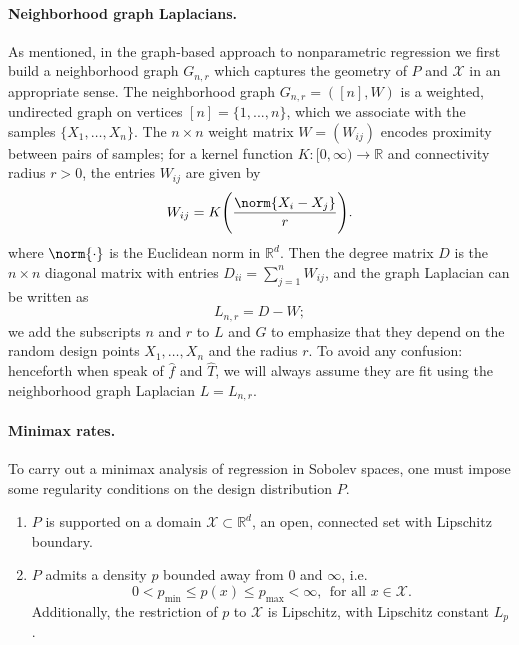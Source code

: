 \documentclass[twoside]{article}
\newcommand{\Reals}{\mathbb{R}}
\newcommand{\1}{\mathbf{1}}
\newcommand{\Rd}{\Reals^d}
\newcommand{\Lap}{L}
\newcommand{\Xset}{\mathcal{X}}
\newcommand{\mc}[1]{\mathcal{#1}}
\newcommand{\wh}[1]{\widehat{#1}}
\theoremstyle{definition}
\theoremstyle{remark}
\begin{document}
\paragraph{Neighborhood graph Laplacians.}
As mentioned, in the graph-based approach to nonparametric regression we first build a neighborhood graph $G_{n,r}$ which captures the geometry of $P$ and $\mc{X}$ in an appropriate sense. The neighborhood graph $G_{n,r} = ([n],W)$ is a weighted, undirected graph on vertices $[n] = \{1,...,n\}$, which we associate with the samples $\{X_1,\ldots,X_n\}$. The $n \times n$ weight matrix $W = (W_{ij})$ encodes proximity between pairs of samples; for a kernel function $K: [0,\infty) \to \Reals$ and connectivity radius $r > 0$, the entries $W_{ij}$ are given by
\begin{equation*}
\label{eqn:neighborhood_graph}
W_{ij} = K\Biggl(\frac{\norm{X_i - X_j}}{r}\Biggr).
\end{equation*}
where $\norm{\cdot}$ is the Euclidean norm in $\Rd$. Then the degree matrix $D$ is the $n \times n$ diagonal matrix with entries $D_{ii} = \sum_{j = 1}^{n}W_{ij}$, and the graph Laplacian can be written as
\begin{equation}
\label{eqn:graph_Laplacian}
\Lap_{n,r} = D - W;
\end{equation}
we add the subscripts $n$ and $r$ to $\Lap$ and $G$ to emphasize that they depend on the random design points $X_1,\ldots,X_n$ and the radius $r$. To avoid any confusion: henceforth when speak of $\wh{f}$ and $\wh{T}$, we will always assume they are fit using the neighborhood graph Laplacian $L = L_{n,r}$. 

\paragraph{Minimax rates.}
To carry out a minimax analysis of regression in Sobolev spaces, one must impose some regularity conditions on the design distribution $P$. 
\begin{enumerate}[label=(P\arabic*)]
	\item
	\label{asmp:domain}
	$P$ is supported on a domain $\Xset \subset \Rd$, an open, connected set with Lipschitz boundary.
	\item
	\label{asmp:bounded_lipschitz_density} 
	$P$ admits a density $p$ bounded away from $0$ and $\infty$, i.e.
	\begin{equation*}
	0 < p_{\min} \leq p(x) \leq p_{\max} < \infty,~~\textrm{for all $x \in \Xset$.}
	\end{equation*}
	Additionally, the restriction of $p$ to $\Xset$ is Lipschitz, with Lipschitz constant $L_p$.
\end{enumerate}
\end{document}
